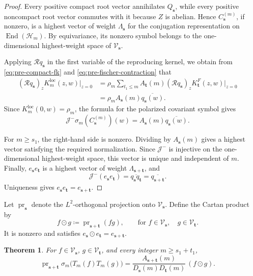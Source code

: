 \documentclass[11pt,reqno]{amsart}
\newtheorem{theorem}{Theorem}[section]
\theoremstyle{corollary}
\theoremstyle{conjecture}
\theoremstyle{assumption}
\theoremstyle{proposition}
\theoremstyle{remark}
\numberwithin{equation}{section}
\begin{document}
\begin{proof}
Every positive compact root vector annihilates $Q_{\mathbf s}$, while every positive noncompact root vector commutes with it because $Z$ is abelian. Hence $C_{\mathbf s}^{(m)}$, if nonzero, is a highest vector of weight $\Lambda_{\mathbf s}$ for the conjugation representation on $\operatorname{End}(\mathcal H_m)$. By equivariance, its nonzero symbol belongs to the one-dimensional highest-weight space of $\mathcal V_{\mathbf s}$.

Applying $\mathcal Rq_{\mathbf s}$ in the first variable of the reproducing kernel, we obtain from \eqref{eq:pre-compact-fk} and \eqref{eq:pre-fischer-contraction} that
\[
\begin{aligned}
(\mathcal Rq_{\mathbf s})_z K_m^{\operatorname{loc}}(z,w)\big|_{z=0}&=\rho_m\sum_{t_1\leq m}A_{\mathbf t}(m)
(\mathcal Rq_{\mathbf s})_z K_{\mathbf t}^F(z,w)\big|_{z=0}\\
&=\rho_m A_{\mathbf s}(m)\overline{q_{\mathbf s}(w)}.
\end{aligned}
\]
Since $K_m^{\operatorname{loc}}(0,w)=\rho_m$, the formula for the polarized covariant symbol gives
\[
\mathcal J^-\sigma_m(C_{\mathbf s}^{(m)})(w)
=A_{\mathbf s}(m)\overline{q_{\mathbf s}(w)}.
\]

For $m\geq s_1$, the right-hand side is nonzero. Dividing by $A_{\mathbf s}(m)$ gives a highest vector satisfying the required normalization. Since $\mathcal J^-$ is injective on the one-dimensional highest-weight space, this vector is unique and independent of $m$.
Finally, $e_{\mathbf s}e_{\mathbf t}$ is a highest vector of weight $\Lambda_{\mathbf s+\mathbf t}$, and
\[
\mathcal J^-(e_{\mathbf s}e_{\mathbf t})=\overline{q_{\mathbf s}q_{\mathbf t}}=\overline{q_{\mathbf s+\mathbf t}}.
\]
Uniqueness gives $e_{\mathbf s}e_{\mathbf t}=e_{\mathbf s+\mathbf t}$.
\end{proof}
Let $\operatorname{pr}_{\mathbf s}$ denote the $L^2$-orthogonal projection onto $\mathcal V_{\mathbf s}$. Define the Cartan product by
\[
f\odot g\coloneq\operatorname{pr}_{\mathbf s+\mathbf t}(fg),\qquad \text{for }f\in\mathcal V_{\mathbf s},\quad g\in\mathcal V_{\mathbf t}.
\]
It is nonzero and satisfies $e_{\mathbf s}\odot e_{\mathbf t}=e_{\mathbf s+\mathbf t}$.
\begin{theorem}\label{thm:pre-exact-cartan}
For $f\in\mathcal V_{\mathbf s}$, $g\in\mathcal V_{\mathbf t}$, and every integer $m\geq s_1+t_1$,
\[
\operatorname{pr}_{\mathbf s+\mathbf t}\sigma_m\bigl(T_m(f)T_m(g)\bigr)=\frac{A_{\mathbf s+\mathbf t}(m)}{D_{\mathbf s}(m)D_{\mathbf t}(m)}\,(f\odot g).
\]
\end{theorem}
\end{document}

